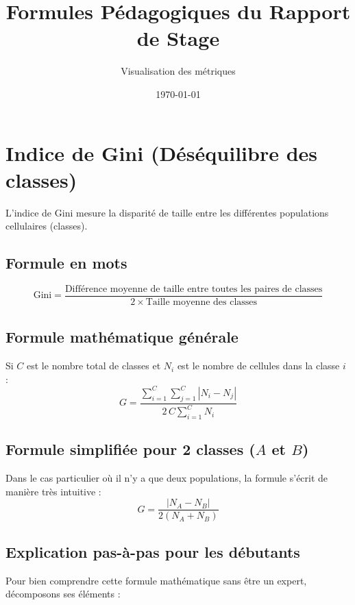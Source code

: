 \documentclass[11pt,a4paper]{article}
\title{\textbf{\color{ubblue}Formules Pédagogiques du Rapport de Stage}}
\author{Visualisation des métriques}
\date{\today}
\begin{document}
\maketitle

\section{Indice de Gini (Déséquilibre des classes)}

L'indice de Gini mesure la disparité de taille entre les différentes populations cellulaires (classes).

\subsection{Formule en mots}
\[
\text{Gini} = \frac{\text{Différence moyenne de taille entre toutes les paires de classes}}{2 \times \text{Taille moyenne des classes}}
\]

\subsection{Formule mathématique générale}
Si $C$ est le nombre total de classes et $N_i$ est le nombre de cellules dans la classe $i$ :
\[
G = \frac{\sum_{i=1}^{C} \sum_{j=1}^{C} |N_i - N_j|}{2 \, C \sum_{i=1}^{C} N_i}
\]

\subsection{Formule simplifiée pour 2 classes ($A$ et $B$)}
Dans le cas particulier où il n'y a que deux populations, la formule s'écrit de manière très intuitive :
\[
G = \frac{|N_A - N_B|}{2(N_A + N_B)}
\]

\subsection{Explication pas-à-pas pour les débutants}

Pour bien comprendre cette formule mathématique sans être un expert, décomposons ses éléments :
\end{document}
